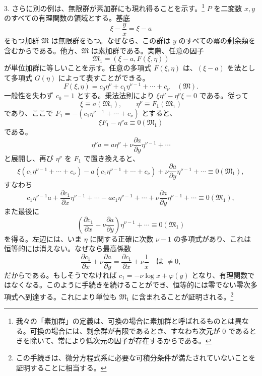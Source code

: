 3. さらに別の例は、無限群が素加群にも現れ得ることを示す。\footnote{我々の「素加群」の定義は、可換の場合に素加群と呼ばれるものとは異なる。可換の場合には、剰余群が有限であるとき、すなわち次元が $0$ であるときを除いて、常により低次元の因子が存在するからである。} $P$ を二変数 $x,y$ のすべての有理関数の領域とする。基底
\[
 \xi-\frac{y}{x}=\xi-a
\]
をもつ加群 $\mathfrak M$ は無限群をもつ。なぜなら、この群は $y$ のすべての冪の剰余類を含むからである。他方、$\mathfrak M$ は素加群である。実際、任意の因子
\[
 \mathfrak M_1=(\xi-a,
F(\xi,\eta))
\]
が単位加群に等しいことを示す。任意の多項式 $F(\xi,\eta)$ は、$(\xi-a)$ を法として多項式 $G(\eta)$ によって表すことができる。
\[
 F(\xi,
\eta)=c_0\eta^\nu+c_1\eta^{\nu-1}+\cdots+c_\nu\quad(\mathfrak M).
\]
一般性を失わず $c_0=1$ とする。乗法法則により $\xi\eta^\nu-\eta^\nu\xi=0$ である。従って
\[
 \xi\equiv a(\mathfrak M_1),
 \qquad
 \eta^\nu\equiv F_1(\mathfrak M_1)
\]
であり、ここで $F_1=-(c_1\eta^{\nu-1}+\cdots+c_\nu)$ とすると、
\[
 \xi F_1-\eta^\nu a\equiv0(\mathfrak M_1)
\]
である。
\[
 \eta^\nu a=a\eta^\nu+\nu\frac{\partial a}{\partial y}\eta^{\nu-1}+\cdots
\]
と展開し、再び $\eta^\nu$ を $F_1$ で置き換えると、
\[
 \xi(c_1\eta^{\nu-1}+\cdots+c_\nu)-a(c_1\eta^{\nu-1}+\cdots+c_\nu)
 +\nu\frac{\partial a}{\partial y}\eta^{\nu-1}+\cdots\equiv0(\mathfrak M_1),
\]
すなわち
\[
 c_1\eta^{\nu-1}a+\frac{\partial c_1}{\partial x}\eta^{\nu-1}+\cdots
 -ac_1\eta^{\nu-1}+\cdots+
\nu\frac{\partial a}{\partial y}\eta^{\nu-1}+\cdots
 \equiv0(\mathfrak M_1),
\]
また最後に
\[
 \left(\frac{\partial c_1}{\partial x}+\nu\frac{\partial a}{\partial y}\right)\eta^{\nu-1}+\cdots
 \equiv0(\mathfrak M_1)
\]
を得る。左辺には、いま $\eta$ に関する正確に次数 $\nu-1$ の多項式があり、これは恒等的には消えない。なぜなら最高係数
\[
 \frac{\partial c_1}{\partial x}+\nu\frac{\partial a}{\partial y}
 =\frac{\partial c_1}{\partial x}+\nu\frac{1}{x}
 \quad\text{は }\ne0,
\]
だからである。もしそうでなければ $c_1=-\nu\log x+\varphi(y)$ となり、有理関数ではなくなる。このように手続きを続けることができ、恒等的には零でない零次多項式へ到達する。これにより単位も $\mathfrak M_1$ に含まれることが証明される。\footnote{この手続きは、微分方程式系に必要な可積分条件が満たされていないことを証明することに相当する。}

